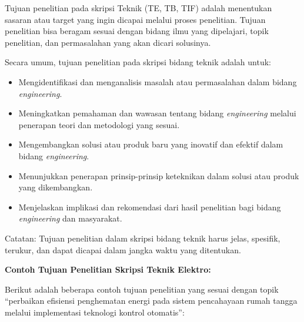 Tujuan penelitian pada skripsi Teknik (TE, TB, TIF) adalah menentukan sasaran atau target yang ingin dicapai melalui proses penelitian. Tujuan penelitian bisa beragam sesuai dengan bidang ilmu yang dipelajari, topik penelitian, dan permasalahan yang akan dicari solusinya.

Secara umum, tujuan penelitian pada skripsi bidang teknik adalah untuk:

\begin{itemize}
	\item Mengidentifikasi dan menganalisis masalah atau permasalahan dalam bidang \textit{engineering}.
	\item Meningkatkan pemahaman dan wawasan tentang bidang \textit{engineering} melalui penerapan teori dan metodologi yang sesuai.
	\item Mengembangkan solusi atau produk baru yang inovatif dan efektif dalam 
	bidang \textit{engineering}.
	\item Menunjukkan penerapan prinsip-prinsip keteknikan dalam solusi atau produk yang dikembangkan.
	\item Menjelaskan implikasi dan rekomendasi dari hasil penelitian bagi bidang \textit{engineering} dan masyarakat.
\end{itemize}

\begin{minipage}{0.92\textwidth}
Catatan: Tujuan penelitian dalam skripsi bidang teknik harus jelas, spesifik, terukur, dan dapat dicapai dalam jangka waktu yang ditentukan.
\end{minipage}

\newpage
\vspace{5mm}
\textbf{Contoh Tujuan Penelitian Skripsi Teknik Elektro:}

\begin{minipage}{0.92\textwidth}
Berikut adalah beberapa contoh tujuan penelitian yang sesuai dengan topik 
“perbaikan efisiensi penghematan energi pada sistem pencahayaan rumah tangga 
melalui implementasi teknologi kontrol otomatis”:
\end{minipage}

